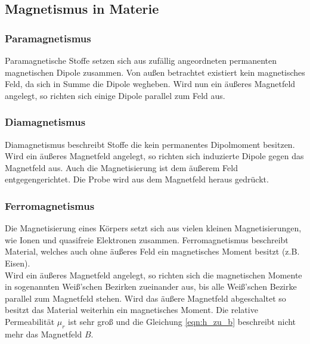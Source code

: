 \subsection{Magnetismus in Materie}

\subsubsection{Paramagnetismus}
Paramagnetische Stoffe setzen sich aus zufällig angeordneten permanenten magnetischen Dipole zusammen. Von außen betrachtet existiert kein
magnetisches Feld, da sich in Summe die Dipole wegheben. Wird nun ein äußeres Magnetfeld angelegt, so richten
sich einige Dipole parallel zum Feld aus.

\subsubsection{Diamagnetismus}
Diamagnetismus beschreibt Stoffe die kein permanentes Dipolmoment besitzen. Wird ein äußeres Magnetfeld angelegt, so richten sich
induzierte Dipole gegen das Magnetfeld aus. Auch die Magnetisierung ist dem äußerem Feld entgegengerichtet. Die Probe wird aus dem Magnetfeld heraus gedrückt.

\subsubsection{Ferromagnetismus}
Die Magnetisierung eines Körpers setzt sich aus vielen kleinen Magnetisierungen, wie Ionen und quasifreie Elektronen zusammen.
Ferromagnetismus beschreibt Material, welches auch ohne äußeres Feld ein magnetisches Moment besitzt (z.B. Eisen).\\
Wird ein äußeres Magnetfeld angelegt, so richten sich die magnetischen Momente in sogenannten Weiß'schen Bezirken zueinander aus,
bis alle Weiß'schen Bezirke parallel zum Magnetfeld stehen. Wird das äußere Magnetfeld abgeschaltet so besitzt das Material weiterhin
ein magnetisches Moment. Die relative Permeabilität $\mu_r$ ist sehr groß und die Gleichung \eqref{eqn:h_zu_b} beschreibt nicht mehr
das Magnetfeld $B$.

